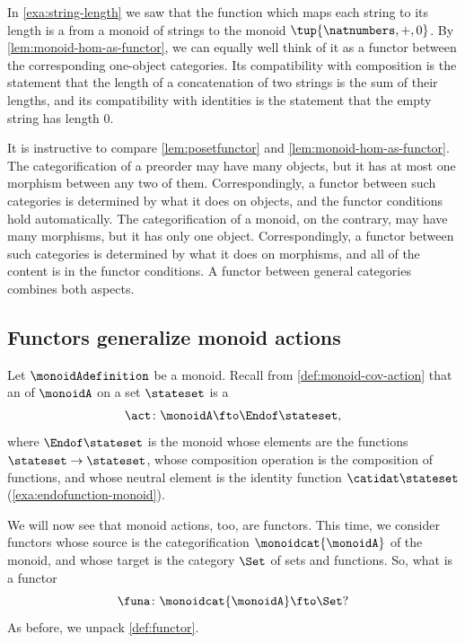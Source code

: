 \begin{example}
    In \cref{exa:string-length} we saw that the function which maps each string to its length is a  from a monoid of strings to the monoid $\tup{\natnumbers, +, 0}$.
    By \cref{lem:monoid-hom-as-functor}, we can equally well think of it as a functor between the corresponding one-object categories.
    Its compatibility with composition is the statement that the length of a concatenation of two strings is the sum of their lengths, and its compatibility with identities is the statement that the empty string has length $0$.
\end{example}

It is instructive to compare \cref{lem:posetfunctor} and \cref{lem:monoid-hom-as-functor}.
The categorification of a preorder may have many objects, but it has at most one morphism between any two of them.
Correspondingly, a functor between such categories is determined by what it does on objects, and the functor conditions hold automatically.
The categorification of a monoid, on the contrary, may have many morphisms, but it has only one object.
Correspondingly, a functor between such categories is determined by what it does on morphisms, and all of the content is in the functor conditions.
A functor between general categories combines both aspects.

\subsection{Functors generalize monoid actions}
\label{sec:functors-generalize-monoid-actions}

Let $\monoidAdefinition$ be a monoid.
Recall from \cref{def:monoid-cov-action} that an  of $\monoidA$ on a set $\stateset$ is a 
\begin{equation}
    \act \colon \monoidA \fto \Endof\stateset,
\end{equation}
where $\Endof\stateset$ is the monoid whose elements are the functions $\stateset \to \stateset$, whose composition operation is the composition of functions, and whose neutral element is the identity function $\catidat\stateset$ (\cref{exa:endofunction-monoid}).

We will now see that monoid actions, too, are functors.
This time, we consider functors whose source is the categorification $\monoidcat{\monoidA}$ of the monoid, and whose target is the category $\Set$ of sets and functions.
So, what is a functor
\begin{equation}
    \funa \colon \monoidcat{\monoidA} \fto \Set?
\end{equation}
As before, we unpack \cref{def:functor}.

